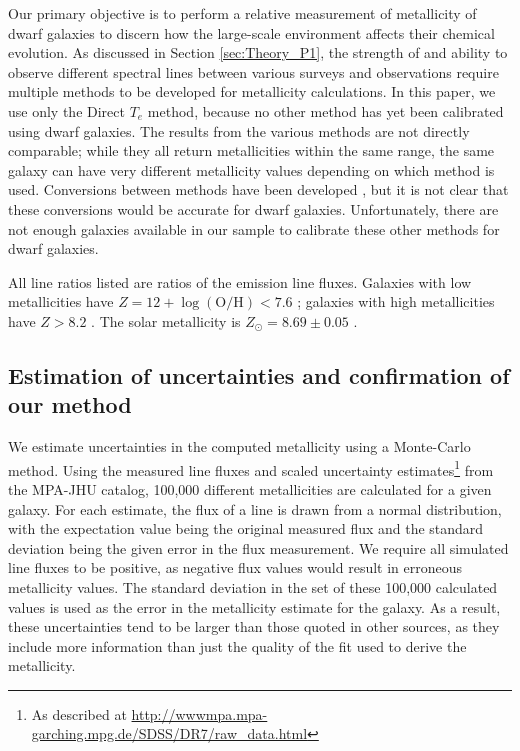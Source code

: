 Our primary objective is to perform a relative measurement of metallicity of 
dwarf galaxies to discern how the large-scale environment affects their chemical 
evolution.  As discussed in Section \ref{sec:Theory_P1}, the strength of and 
ability to observe different spectral lines between various surveys and 
observations require multiple methods to be developed for metallicity 
calculations.  In this paper, we use only the Direct $T_e$ method, because no 
other method has yet been calibrated using dwarf galaxies.  The results from the 
various methods are not directly comparable; while they all return metallicities 
within the same range, the same galaxy can have very different metallicity 
values depending on which method is used.  Conversions between methods have been 
developed \citep[see][]{Kewley08}, but it is not clear that these conversions 
would be accurate for dwarf galaxies.  Unfortunately, there are not enough 
galaxies available in our sample to calibrate these other methods for dwarf 
galaxies.  

All line ratios listed are ratios of the emission line fluxes.  Galaxies with 
low metallicities have $Z = 12 + \log (\text{O}/\text{H}) < 7.6$ 
\citep{Pustilnik06}; galaxies with high metallicities have $Z > 8.2$ 
\citep{Pilyugin06}.  The solar metallicity is $Z_{\odot} = 8.69\pm 0.05$ 
\citep{Asplund09}.


\subsection{Estimation of uncertainties and confirmation of our method}

We estimate uncertainties in the computed metallicity using a Monte-Carlo 
method.  Using the measured line fluxes and scaled uncertainty 
estimates\footnote{As described at 
\url{http://wwwmpa.mpa-garching.mpg.de/SDSS/DR7/raw_data.html}} from the 
MPA-JHU catalog, 100,000 different metallicities are calculated for a given 
galaxy.  For each estimate, the flux of a line is drawn from a normal 
distribution, with the expectation value being the original measured flux and 
the standard deviation being the given error in the flux measurement.  
We require all simulated line fluxes to be positive, as negative flux values 
would result in erroneous metallicity values.  The standard deviation in the set 
of these 100,000 calculated values is used as the error in the metallicity 
estimate for the galaxy.  As a result, these uncertainties tend to be larger 
than those quoted in other sources, as they include more information than just 
the quality of the fit used to derive the metallicity.

